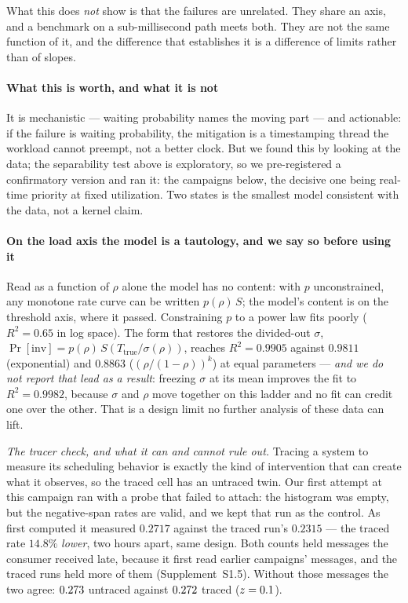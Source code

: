 \documentclass[10pt,journal,onecolumn]{IEEEtran}
\begin{document}
What this does \emph{not} show is that the failures are unrelated. They
share an axis, and a benchmark on a sub-millisecond path meets both. They are not the
same function of it, and the difference that establishes it is a difference of limits
rather than of slopes.

\paragraph{What this is worth, and what it is not} It is mechanistic --- waiting probability names the
moving part --- and actionable: if the failure is waiting probability, the mitigation is a timestamping thread
the workload cannot preempt, not a better clock. But we found this by looking at the data; the separability test above is exploratory, so we pre-registered a confirmatory version and ran it: the campaigns below, the decisive
one being real-time priority at fixed utilization. Two states is the smallest model consistent with the data, not a kernel claim.

\paragraph{On the load axis the model is a tautology, and we say so before using it} Read as a function of $\rho$ alone the model has no content: with $p$
unconstrained, any monotone rate curve can be written $p(\rho)\,S$; the model's content is on
the threshold axis, where it passed. Constraining $p$ to a power law fits poorly ($R^2 = 0.65$
in log space). The form that restores the divided-out $\sigma$,
$\Pr[\text{inv}] = p(\rho)\,S(T_{\mathrm{true}}/\sigma(\rho))$, reaches $R^2 = 0.9905$
against $0.9811$ (exponential) and $0.8863$ ($(\rho/(1-\rho))^k$) at equal parameters ---
\emph{and we do not report that lead as a result}: freezing $\sigma$ at its mean improves the
fit to $R^2 = 0.9982$, because $\sigma$ and $\rho$ move together on this ladder and no fit can
credit one over the other. That is a design limit no further analysis of these data can lift.



\emph{The tracer check, and what it can and cannot rule out.} Tracing a system to measure its
scheduling behavior is exactly the kind of intervention that can create what it observes, so the
traced cell has an untraced twin. Our first attempt at this campaign ran with a probe that failed
to attach: the histogram was empty, but the negative-span rates are valid, and we kept that run as the
control. As first computed it measured $0.2717$ against the traced run's $0.2315$ --- the traced
rate $14.8\%$ \emph{lower}, two hours apart, same design. Both counts held messages the consumer
received late, because it first read earlier campaigns' messages, and the traced runs held more
of them (Supplement~S1.5). Without those messages the two agree: $0.273$ untraced against
$0.272$ traced ($z = 0.1$).
\end{document}
